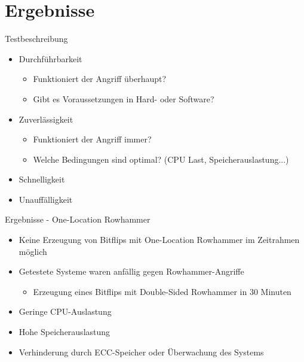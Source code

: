 \documentclass[german,10pt,xcolor=colortbl,compress
]{beamer}
\begin{document}
\section{Ergebnisse}
\begin{frame}{Testbeschreibung}
\begin{itemize}
	\item Durchführbarkeit
	\begin{itemize}
		\item Funktioniert der Angriff überhaupt?
		\item Gibt es Voraussetzungen in Hard- oder Software?
	\end{itemize}
	\item Zuverlässigkeit
	\begin{itemize}
		\item Funktioniert der Angriff immer?
		\item Welche Bedingungen sind optimal? (CPU Last, Speicherauslastung...)
	\end{itemize}
	\item Schnelligkeit
	\item Unauffälligkeit
\end{itemize}
\end{frame}
\begin{frame}{Ergebnisse - One-Location Rowhammer}
\begin{itemize}
\item Keine Erzeugung von Bitflips mit One-Location Rowhammer im Zeitrahmen möglich
\item Getestete Systeme waren anfällig gegen Rowhammer-Angriffe
	\begin{itemize}
	\item Erzeugung eines Bitflips mit Double-Sided Rowhammer in 30 Minuten
	\end{itemize}
\item Geringe CPU-Auslastung
\item Hohe Speicherauslastung
\item Verhinderung durch ECC-Speicher oder Überwachung des Systems
\end{itemize}

\end{frame}
\end{document}

